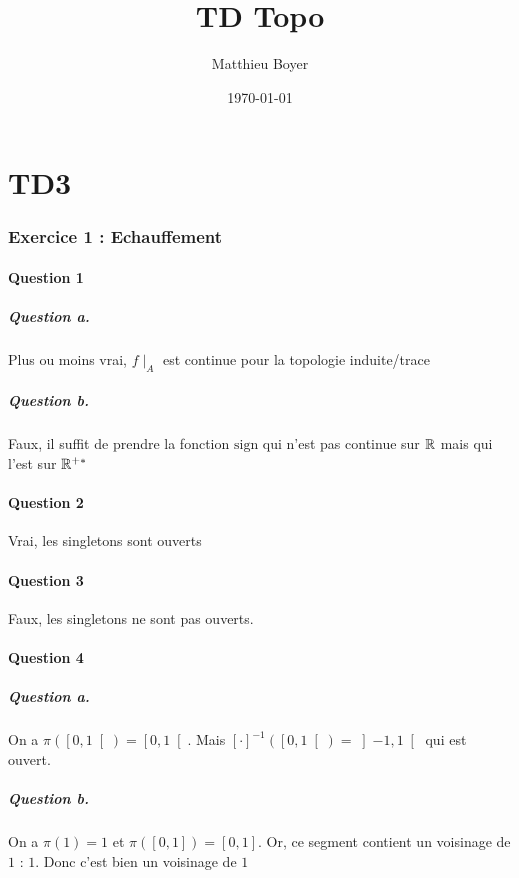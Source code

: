 \documentclass{cours}
\title{TD Topo}
\date{\today}
\author{Matthieu Boyer}
\begin{document}
\part{TD3}
\section{Exercice 1 : Echauffement}
    \subsection{Question 1}
        \subsubsection{Question a.}
            Plus ou moins vrai, $f\mid_{A}$ est continue pour la topologie induite/trace
        \subsubsection{Question b.}
            Faux, il suffit de prendre la fonction $\mathrm{sign}$ qui n'est pas continue sur 
             $\mathbb{R}$ mais qui l'est sur $\mathbb{R}^{+*}$
    \subsection{Question 2}
        Vrai, les singletons sont ouverts
    
    \subsection{Question 3}
        Faux, les singletons ne sont pas ouverts.
    
    \subsection{Question 4}
        \subsubsection{Question a.}
            On a $\pi\left(\left[0, 1\right[\right) = \left[0, 1\right[$. Mais $\left[\cdot\right]^{-1} \left(\left[0, 1\right[\right) = \left]-1, 1\right[$ qui est ouvert.

        \subsubsection{Question b.}
            On a $\pi(1) = 1$ et $\pi\left(\left[0, 1\right]\right) = \left[0, 1\right]$. Or, ce segment contient un voisinage de $1$ : ${1}$. Donc c'est bien un voisinage de $1$
        
\end{document}
